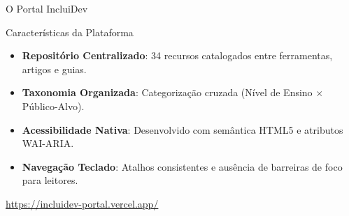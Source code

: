\documentclass[aspectratio=169]{beamer}
\begin{document}
\begin{frame}{O Portal IncluiDev}
    \begin{block}{Características da Plataforma}
        \begin{itemize}
            \item \textbf{Repositório Centralizado}: 34 recursos catalogados entre ferramentas, artigos e guias.
            \item \textbf{Taxonomia Organizada}: Categorização cruzada (Nível de Ensino $\times$ Público-Alvo).
            \item \textbf{Acessibilidade Nativa}: Desenvolvido com semântica HTML5 e atributos WAI-ARIA.
            \item \textbf{Navegação Teclado}: Atalhos consistentes e ausência de barreiras de foco para leitores.
        \end{itemize}
    \end{block}

    \vspace{0.4cm}
    \centering
    {\large \url{https://incluidev-portal.vercel.app/}}

\end{frame}
\end{document}
